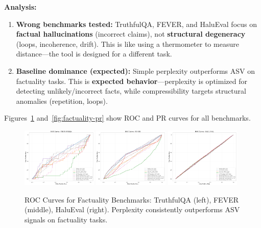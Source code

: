 \documentclass[11pt]{article}
\begin{document}
\textbf{Analysis:}
\begin{enumerate}
\item \textbf{Wrong benchmarks tested:} TruthfulQA, FEVER, and HaluEval focus on \textbf{factual hallucinations} (incorrect claims), not \textbf{structural degeneracy} (loops, incoherence, drift). This is like using a thermometer to measure distance---the tool is designed for a different task.
\item \textbf{Baseline dominance (expected):} Simple perplexity outperforms ASV on factuality tasks. This is \textbf{expected behavior}---perplexity is optimized for detecting unlikely/incorrect facts, while compressibility targets structural anomalies (repetition, loops).
\end{enumerate}

Figures~\ref{fig:factuality-roc} and~\ref{fig:factuality-pr} show ROC and PR curves for all benchmarks.

\begin{figure}[h]
\centering
\includegraphics[width=0.32\textwidth]{figures/truthfulqa_roc_curves.png}
\includegraphics[width=0.32\textwidth]{figures/fever_roc_curves.png}
\includegraphics[width=0.32\textwidth]{figures/halueval_roc_curves.png}
\caption{ROC Curves for Factuality Benchmarks: TruthfulQA (left), FEVER (middle), HaluEval (right). Perplexity consistently outperforms ASV signals on factuality tasks.}
\label{fig:factuality-roc}
\end{figure}
\end{document}
